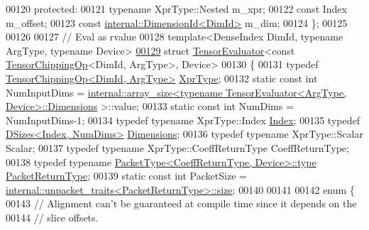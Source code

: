 \begin{DoxyCode}
00120   \textcolor{keyword}{protected}:
00121     \textcolor{keyword}{typename} XprType::Nested m\_xpr;
00122     \textcolor{keyword}{const} Index m\_offset;
00123     \textcolor{keyword}{const} \hyperlink{struct_eigen_1_1internal_1_1_dimension_id}{internal::DimensionId<DimId>} m\_dim;
00124 \};
00125 
00126 
00127 \textcolor{comment}{// Eval as rvalue}
00128 \textcolor{keyword}{template}<DenseIndex DimId, \textcolor{keyword}{typename} ArgType, \textcolor{keyword}{typename} Device>
\hyperlink{struct_eigen_1_1_tensor_evaluator_3_01const_01_tensor_chipping_op_3_01_dim_id_00_01_arg_type_01_4_00_01_device_01_4}{00129} \textcolor{keyword}{struct }\hyperlink{struct_eigen_1_1_tensor_evaluator}{TensorEvaluator}<const \hyperlink{class_eigen_1_1_tensor_chipping_op}{TensorChippingOp}<DimId, ArgType>, Device>
00130 \{
00131   \textcolor{keyword}{typedef} \hyperlink{class_eigen_1_1_tensor_chipping_op}{TensorChippingOp<DimId, ArgType>} 
      \hyperlink{class_eigen_1_1_tensor_chipping_op}{XprType};
00132   \textcolor{keyword}{static} \textcolor{keyword}{const} \textcolor{keywordtype}{int} NumInputDims = 
      \hyperlink{struct_eigen_1_1internal_1_1array__size}{internal::array\_size<typename TensorEvaluator<ArgType, Device>::Dimensions}
      >::value;
00133   \textcolor{keyword}{static} \textcolor{keyword}{const} \textcolor{keywordtype}{int} NumDims = NumInputDims-1;
00134   \textcolor{keyword}{typedef} \textcolor{keyword}{typename} XprType::Index \hyperlink{namespace_eigen_a62e77e0933482dafde8fe197d9a2cfde}{Index};
00135   \textcolor{keyword}{typedef} \hyperlink{struct_eigen_1_1_d_sizes}{DSizes<Index, NumDims>} \hyperlink{struct_eigen_1_1_d_sizes}{Dimensions};
00136   \textcolor{keyword}{typedef} \textcolor{keyword}{typename} XprType::Scalar Scalar;
00137   \textcolor{keyword}{typedef} \textcolor{keyword}{typename} XprType::CoeffReturnType CoeffReturnType;
00138   \textcolor{keyword}{typedef} \textcolor{keyword}{typename} \hyperlink{group___sparse_core___module}{PacketType<CoeffReturnType, Device>::type} 
      \hyperlink{group___sparse_core___module}{PacketReturnType};
00139   \textcolor{keyword}{static} \textcolor{keyword}{const} \textcolor{keywordtype}{int} PacketSize = 
      \hyperlink{struct_eigen_1_1internal_1_1unpacket__traits}{internal::unpacket\_traits<PacketReturnType>::size};
00140 
00141 
00142   \textcolor{keyword}{enum} \{
00143     \textcolor{comment}{// Alignment can't be guaranteed at compile time since it depends on the}
00144     \textcolor{comment}{// slice offsets.}

\end{DoxyCode}
